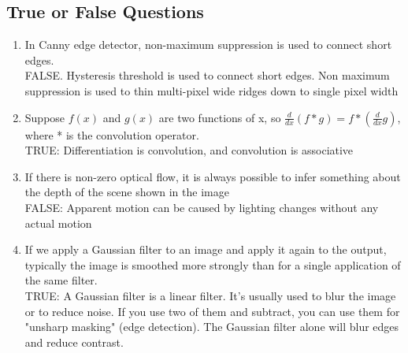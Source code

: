 \documentclass[12pt,letterpaper]{article}
\begin{document}
\subsection{True or False Questions}
\begin{enumerate}
    \item In Canny edge detector, non-maximum suppression is used to connect short edges. \\
    \color{red}
    FALSE.  Hysteresis threshold is used to connect short edges. Non maximum suppression is used to thin multi-pixel wide ridges down to single pixel width
    \color{black}
    \item Suppose $f(x)$ and $g(x)$ are two functions of x, so $\frac{d}{dx}(f*g) = f*(\frac{d}{dx}g)$, where * is the convolution operator. \\
    \color{red}
    TRUE: Differentiation is convolution, and convolution is associative 
    \color{black}
    \item If there is non-zero optical ﬂow, it is always possible to infer something about the depth of
the scene shown in the image\\
    \color{red}
    FALSE: Apparent motion can be caused by lighting changes without any
actual motion
    \color{black}
    \item If we apply a Gaussian filter to an image and apply it again to the output, typically the image is smoothed more strongly than for a single application of the same filter.\\
    \color{red}
    TRUE: A Gaussian filter is a linear filter. It's usually used to blur the image or to reduce noise. If you use two of them and subtract, you can use them for "unsharp masking" (edge detection). The Gaussian filter alone will blur edges and reduce contrast.
    \color{black}
\end{enumerate}
\end{document}
